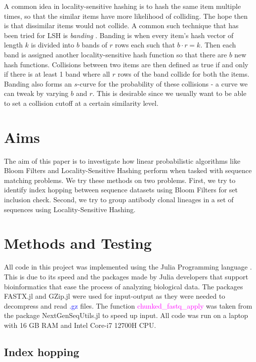 \documentclass[times, twoside, watermark]{zHenriquesLab-StyleBioRxiv}
\begin{document}
A common idea in locality-sensitive hashing is to hash the same item multiple times, so that the similar items have more likelihood of colliding. The hope then is that dissimilar items would not collide. A common such technique that has been tried for LSH is \emph{banding} \cite{LSH}. Banding is when every item's hash vector of length $k$ is divided into $b$ bands of $r$ rows each such that $b\cdot r = k$. Then each band is assigned another locality-sensitive hash function so that there are $b$ new hash functions. Collisions between two items are then defined as true if and only if there is at least 1 band where all $r$ rows of the band collide for both the items. Banding also forms an $s$-curve for the probability of these collisions - a curve we can tweak by varying $b$ and $r$. This is desirable since we usually want to be able to set a collision cutoff at a certain similarity level.

\section*{Aims}
The aim of this paper is to investigate how linear probabilistic algorithms like Bloom Filters and Locality-Sensitive Hashing perform when tasked with sequence matching problems. We try these methods on two problems. First, we try to identify index hopping between sequence datasets using Bloom Filters for set inclusion check. Second, we try to group antibody clonal lineages in a set of sequences using Locality-Sensitive Hashing.

\section*{Methods and Testing}

All code in this project was implemented using the Julia Programming language \cite{Julia}. This is due to its speed and the packages made by Julia developers that support bioinformatics that ease the process of analyzing biological data. The packages FASTX.jl and GZip.jl were used for input-output as they were needed to decompress and read \textcolor{blue}{.gz} files. The function \textcolor{magenta}{chunked\_fastq\_apply} was taken from the package NextGenSeqUtils.jl to speed up input. All code was run on a laptop with 16 GB RAM and Intel Core-i7 12700H CPU. 

\subsection*{Index hopping}
\end{document}
